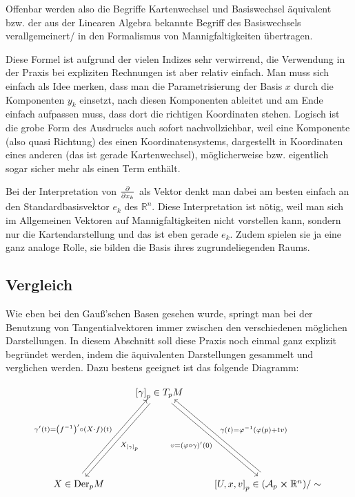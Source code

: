 \documentclass[../H_Analysis_main.tex]{subfiles}
\begin{document}
\begin{bsp}
Offenbar werden also die Begriffe Kartenwechsel und Basiswechsel äquivalent bzw. der aus der Linearen Algebra bekannte Begriff des Basiswechsels verallgemeinert/ in den Formalismus von Mannigfaltigkeiten übertragen.
\end{bsp}

Diese Formel ist aufgrund der vielen Indizes sehr verwirrend, die Verwendung in der Praxis bei expliziten Rechnungen ist aber relativ einfach. Man muss sich einfach als Idee merken, dass man die Parametrisierung der Basis $x$ durch die Komponenten $y_k$ einsetzt, nach diesen Komponenten ableitet und am Ende einfach aufpassen muss, dass dort die richtigen Koordinaten stehen.  Logisch ist die grobe Form des Ausdrucks auch sofort nachvollziehbar, weil eine Komponente (also quasi Richtung) des einen Koordinatensystems, dargestellt in Koordinaten eines anderen (das ist gerade Kartenwechsel), möglicherweise bzw. eigentlich sogar sicher mehr als einen Term enthält.

Bei der Interpretation von $\pdv{x_k}$ als Vektor denkt man dabei am besten einfach an den Standardbasisvektor $e_k$ des $\mathbb{R}^n$. Diese Interpretation ist nötig, weil man sich im Allgemeinen Vektoren auf Mannigfaltigkeiten nicht vorstellen kann, sondern nur die Kartendarstellung und das ist eben gerade $e_k$. Zudem spielen sie ja eine ganz analoge Rolle, sie bilden die Basis ihres zugrundeliegenden Raums.



		\subsection{Vergleich}
Wie eben bei den Gauß'schen Basen gesehen wurde, springt man bei der Benutzung von Tangentialvektoren immer zwischen den verschiedenen möglichen Darstellungen. In diesem Abschnitt soll diese Praxis noch einmal ganz explizit begründet werden, indem die äquivalenten Darstellungen gesammelt und verglichen werden. Dazu bestens geeignet ist das folgende Diagramm:

$$
\begin{tikzcd}[row sep = 76, column sep = 24]%
 & \arrow{dl}{X_{\qty[\gamma]_p}} \qty[\gamma]_p \in T_p M \arrow[swap]{dr}{v = \qty(\varphi \circ \gamma)'(0)} &  \\
X \in \text{Der}_p M \arrow[shift left = 0.5em]{ur}{\gamma'(t) = \qty(f^{-1})' \circ \qty(X \cdot f)(t)}%
 & & \qty[U, x, v]_p \in \qty(\mathcal{A}_p \cross \mathbb{R}^n)/\sim \arrow[swap, shift right = 0.5em]{ul}{\gamma(t) = \varphi^{-1}\qty(\varphi(p) + t v)}
\end{tikzcd}
$$
\end{document}
